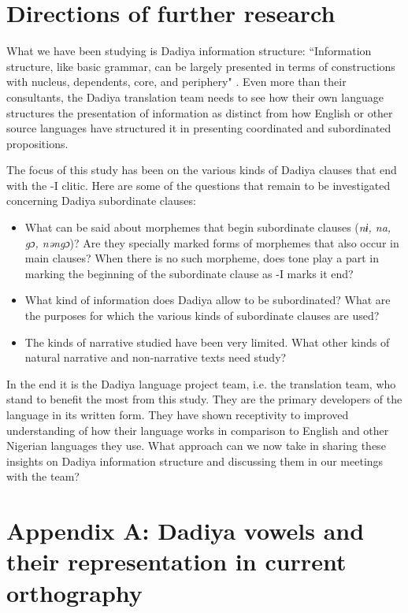 \documentclass[output=paper]{langscibook}
\begin{document}
\section{Directions of further research}

What we have been studying is Dadiya information structure: ``Information structure, like basic grammar, can be largely presented in terms of constructions with nucleus, dependents, core, and periphery" \citep[26]{Dooley2017}. Even more than their consultants, the Dadiya translation team needs to see how their own language structures the presentation of information as distinct from how English or other source languages have structured it in presenting coordinated and subordinated propositions.

The focus of this study has been on the various kinds of Dadiya clauses that end with the -I clitic. Here are some of the questions that remain to be investigated concerning Dadiya subordinate clauses:

\begin{itemize}
\item What can be said about morphemes that begin subordinate clauses (\textit{nɨ, na, gɔ, nəngɔ})? Are they specially marked forms of morphemes that also occur in main clauses? When there is no such morpheme, does tone play a part in marking the beginning of the subordinate clause as -I marks it end? 
\item What kind of information does Dadiya allow to be subordinated? What are the purposes for which the various kinds of subordinate clauses are used?
\item The kinds of narrative studied have been very limited. What other kinds of natural narrative and non-narrative texts need study?
\end{itemize}


In the end it is the Dadiya language project team, i.e. the translation team, who stand to benefit the most from this study. They are the primary developers of the language in its written form. They have shown receptivity to improved understanding of how their language works in comparison to English and other Nigerian languages they use. What approach can we now take in sharing these insights on Dadiya information structure and discussing them in our meetings with the team?

\section*{Appendix A: Dadiya vowels and their representation in current orthography}
\end{document}
